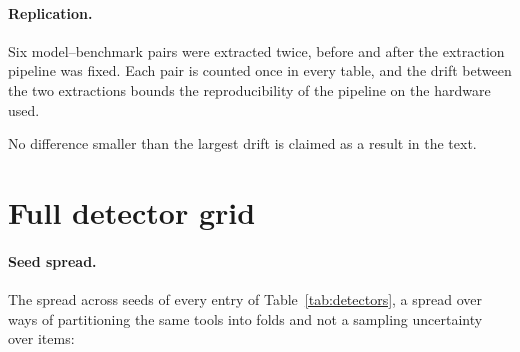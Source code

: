 \paragraph{Replication.}
Six model--benchmark pairs were extracted twice, before and after the extraction pipeline was fixed. Each
pair is counted once in every table, and the drift between the two extractions bounds the reproducibility of
the pipeline on the hardware used.
\begin{center}
\small

\end{center}
No difference smaller than the largest drift is claimed as a result in the text.

\section{Full detector grid}
\label{app:tables}

\begin{table}[h]
\centering
\scriptsize
\caption{One detector family per column, scored on the hardest population each run supports: the
call-expected items where the benchmark has an abstention category, every parseable call otherwise. Bold
marks every detector within one seed standard deviation of the row's leader, since the ordering inside that
band changes with the seed; the paired intervals of Appendix~\ref{app:stats} are the uncertainty of any
comparison. \emph{avg.\ spectral} averages over heads before computing anything; \emph{surface} is the length
floor.}
\label{tab:detectors}

\end{table}

\begin{table}[h]
\centering
\small
\caption{The access frontier in numbers: fixed representatives per tier, the length floor, and each
representative's margin over the floor. Subsets as in Table~\ref{tab:detectors}.}
\label{tab:frontier}

\end{table}

\paragraph{Seed spread.}
\label{app:spread}
The spread across seeds of every entry of Table~\ref{tab:detectors}, a spread over ways of partitioning the
same tools into folds and not a sampling uncertainty over items:
\begin{center}
\tiny

\end{center}

